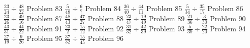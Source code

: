 \documentclass{article}
\begin{document}
\newline
\hfill \break
$\displaystyle \frac{23}{24} \div \frac{48}{22}$
\newline
\hfill \break
Problem 83
\newline
\hfill \break
$\displaystyle \frac{5}{48} \div \frac{6}{7}$
\newline
\hfill \break
Problem 84
\newline
\hfill \break
$\displaystyle \frac{36}{40} \div \frac{44}{11}$
\newline
\hfill \break
Problem 85
\newline
\hfill \break
$\displaystyle \frac{5}{34} \div \frac{35}{17}$
\newline
\hfill \break
Problem 86
\newline
\hfill \break
$\displaystyle \frac{23}{26} \div \frac{49}{16}$
\newline
\hfill \break
Problem 87
\newline
\hfill \break
$\displaystyle \frac{48}{43} \div \frac{47}{27}$
\newline
\hfill \break
Problem 88
\newline
\hfill \break
$\displaystyle \frac{23}{47} \div \frac{19}{49}$
\newline
\hfill \break
Problem 89
\newline
\hfill \break
$\displaystyle \frac{21}{36} \div \frac{3}{30}$
\newline
\hfill \break
Problem 90
\newline
\hfill \break
$\displaystyle \frac{43}{31} \div \frac{44}{22}$
\newline
\hfill \break
Problem 91
\newline
\hfill \break
$\displaystyle \frac{23}{2} \div \frac{15}{12}$
\newline
\hfill \break
Problem 92
\newline
\hfill \break
$\displaystyle \frac{31}{32} \div \frac{42}{39}$
\newline
\hfill \break
Problem 93
\newline
\hfill \break
$\displaystyle \frac{5}{39} \div \frac{22}{20}$
\newline
\hfill \break
Problem 94
\newline
\hfill \break
$\displaystyle \frac{27}{19} \div \frac{9}{26}$
\newline
\hfill \break
Problem 95
\newline
\hfill \break
$\displaystyle \frac{37}{32} \div \frac{15}{45}$
\newline
\hfill \break
Problem 96
\newline
\end{document}

